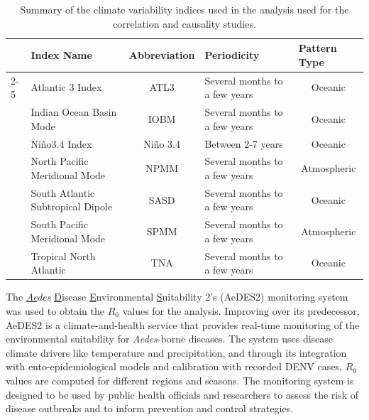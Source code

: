 \documentclass[10pt,twocolumn]{wlscirep}
\begin{document}
\begin{table}[t]
  \centering
  \begin{tabular}{ll|c|l|c}
                             & \textbf{Index Name}               & \multicolumn{1}{l|}{\textbf{Abbreviation}} & \textbf{Periodicity}          & \multicolumn{1}{l}{\textbf{Pattern Type}} \\ \cline{2-5}
    \cellcolor[HTML]{EF476F} & Atlantic 3 Index                  & ATL3                                       & Several months to a few years & Oceanic                                   \\
    \cellcolor[HTML]{F78C6B} & Indian Ocean Basin Mode           & IOBM                                       & Several months to a few years & Oceanic                                   \\
    \cellcolor[HTML]{FFD166} & Niño3.4 Index                     & Niño 3.4                                   & Between 2-7 years             & Oceanic                                   \\
    \cellcolor[HTML]{83D483} & North Pacific Meridional Mode     & NPMM                                       & Several months to a few years & Atmospheric                               \\
    \cellcolor[HTML]{06D6A0} & South Atlantic Subtropical Dipole & SASD                                       & Several months to a few years & Oceanic                                   \\
    \cellcolor[HTML]{118AB2} & South Pacific Meridional Mode     & SPMM                                       & Several months to a few years & Atmospheric                               \\
    \cellcolor[HTML]{073B4C} & Tropical North Atlantic           & TNA                                        & Several months to a few years & Oceanic
  \end{tabular}
  \caption{Summary of the climate variability indices used in the analysis used for the correlation and causality studies.}
  \label{tab:climate-variability-indices}
\end{table}

The \textit{\underline{Ae}des} \underline{D}isease \underline{E}nvironmental \underline{S}uitability 2's (AeDES2) monitoring system\cite{guerra_2025} was used to obtain the $R_0$ values for the analysis. Improving over its predecessor\cite{munoz_2020a}, AeDES2 is a climate-and-health service that provides real-time monitoring of the environmental suitability for \textit{Aedes}-borne diseases. The system uses disease climate drivers like temperature and precipitation, and through its integration with ento-epidemiological models and calibration with recorded DENV cases, $R_0$ values are computed for different regions and seasons. The monitoring system is designed to be used by public health officials and researchers to assess the risk of disease outbreaks and to inform prevention and control strategies.
\end{document}
